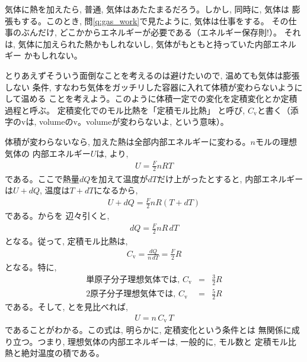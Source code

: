 気体に熱を加えたら, 普通, 気体はあたたまるだろう。しかし, 同時に, 気体は
膨張もする。このとき, 問\ref{q:gas_work}で見たように, 気体は仕事をする。
その仕事のぶんだけ, どこかからエネルギーが必要である（エネルギー保存則!）。
それは, 気体に加えられた熱かもしれないし, 気体がもともと持っていた内部エネルギー
かもしれない。

とりあえずそういう面倒なことを考えるのは避けたいので, 温めても気体は膨張しない
条件, すなわち気体をガッチリした容器に入れて体積が変わらないようにして温める
ことを考えよう。このように体積一定での変化を定積変化とか定積過程と呼ぶ。
定積変化でのモル比熱を「定積モル比熱」
と呼び, $C_{\text{v}}$と書く（添字のvは, volumeのv。volumeが変わらないよ, 
という意味）。

体積が変わらないなら, 加えた熱は全部内部エネルギーに変わる。$n$モルの理想気体の
内部エネルギー$U$は, より, 
\begin{eqnarray}
U=\frac{F}{2}nRT\label{eq:specific_heat_vconst2}
\end{eqnarray}
である。ここで熱量$dQ$を加えて温度が$dT$だけ上がったとすると, 内部エネルギーは$U+dQ$, 
温度は$T+dT$になるから, 
\begin{eqnarray}
U+dQ=\frac{F}{2}nR(T+dT)\label{eq:specific_heat_vconst4}
\end{eqnarray}
である。からを
辺々引くと, 
\begin{eqnarray}
dQ=\frac{F}{2}nR\,dT\label{eq:specific_heat_vconst6}
\end{eqnarray}
となる。従って, 定積モル比熱は, 
\begin{eqnarray}
C_{\text{v}}=\frac{dQ}{n\,dT}=\frac{F}{2}R\label{eq:gas_specificheat}
\end{eqnarray}
となる。特に, 
\begin{eqnarray}
\text{単原子分子理想気体では, }C_{\text{v}}&=&\frac{3}{2}R\label{eq:Cv_monomol}\\
\text{2原子分子理想気体では, }C_{\text{v}}&=&\frac{5}{2}R\label{eq:Cv_2mol}
\end{eqnarray}
である。そして, とを見比べれば, 
\begin{eqnarray}
U=n\,C_{\text{v}}\,T\label{eq:U_nCvT}
\end{eqnarray}
であることがわかる。この式は, 明らかに, 定積変化という条件とは
無関係に成り立つ。つまり, 理想気体の内部エネルギーは, 一般的に, モル数と
定積モル比熱と絶対温度の積である。

